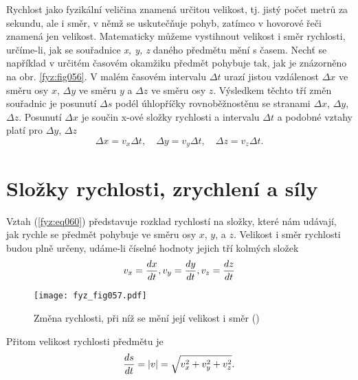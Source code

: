     Rychlost jako fyzikální veličina znamená určitou velikost, tj. jistý počet metrů za sekundu, 
    ale i směr, v němž se uskutečňuje pohyb, zatímco v hovorové řeči znamená jen velikost. 
    Matematicky můžeme vystihnout velikost i směr rychlosti, určíme-li, jak se souřadnice \emph{x, 
    y, z} daného předmětu mění s časem. Nechť se například v určitém časovém okamžiku předmět 
    pohybuje tak, jak je znázorněno na obr. \ref{fyz:fig056}. V malém časovém intervalu \(\Delta 
    t\) urazí jistou vzdálenost \(\Delta x\) ve směru osy \(x\), \(\Delta y\) ve směru \(y\) a 
    \(\Delta z\) ve směru osy \(z\). Výsledkem těchto tří změn souřadnic je posunutí \(\Delta s\) 
    podél úhlopříčky rovnoběžnostěnu se stranami \(\Delta x\), \(\Delta y\), \(\Delta z\). Posunutí 
    \(\Delta x\) je součin x-ové složky rychlosti a intervalu \(\Delta t\) a podobné vztahy platí 
    pro \(\Delta y\), \(\Delta z\)
    \begin{equation}\label{fyz:eq060}
      \Delta x = v_x\Delta t,\quad \Delta y = v_y\Delta t,\quad \Delta z = v_z\Delta t.
    \end{equation}
    
  \section{Složky rychlosti, zrychlení a síly}\label{fyz:IchapIXsecIII}
    Vztah (\ref{fyz:eq060}) představuje rozklad rychlostí na složky, které nám udávají, jak rychle 
    se předmět pohybuje ve směru osy \(x\), \(y\), a \(z\). Velikost i směr rychlosti budou plně 
    určeny, udáme-li číselné hodnoty jejich tří kolmých složek
    \begin{equation}\label{fyz:eq061}
      v_x = \dfrac{d x}{d t}, v_y = \dfrac{d y}{d t}, v_z = \dfrac{d z}{d t}
    \end{equation}

    \begin{figure}[ht!]  %
      \centering
      \texttt{[image: fyz\_fig057.pdf]}
      \caption{Změna rychlosti, při níž se mění její velikost i směr (\cite[s.~125]{Feynman01})}
      \label{fyz:fig057}
    \end{figure}
    
    Přitom velikost rychlosti předmětu je
    \begin{equation}\label{fyz:eq062}
      \dfrac{d s}{d t} = \left\lvert v\right\rvert = \sqrt{v^2_x + v^2_y + v^2_z}. 
    \end{equation}
    

